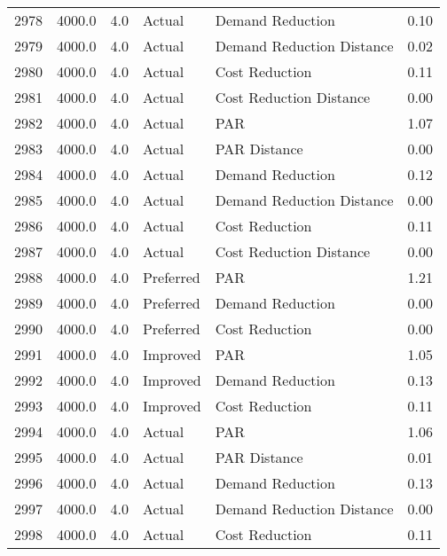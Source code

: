 \begin{longtable}{lrrllr}
2978 &       4000.0 &     4.0 &         Actual &           Demand Reduction &   0.10 \\
2979 &       4000.0 &     4.0 &         Actual &  Demand Reduction Distance &   0.02 \\
2980 &       4000.0 &     4.0 &         Actual &             Cost Reduction &   0.11 \\
2981 &       4000.0 &     4.0 &         Actual &    Cost Reduction Distance &   0.00 \\
2982 &       4000.0 &     4.0 &         Actual &                        PAR &   1.07 \\
2983 &       4000.0 &     4.0 &         Actual &               PAR Distance &   0.00 \\
2984 &       4000.0 &     4.0 &         Actual &           Demand Reduction &   0.12 \\
2985 &       4000.0 &     4.0 &         Actual &  Demand Reduction Distance &   0.00 \\
2986 &       4000.0 &     4.0 &         Actual &             Cost Reduction &   0.11 \\
2987 &       4000.0 &     4.0 &         Actual &    Cost Reduction Distance &   0.00 \\
2988 &       4000.0 &     4.0 &      Preferred &                        PAR &   1.21 \\
2989 &       4000.0 &     4.0 &      Preferred &           Demand Reduction &   0.00 \\
2990 &       4000.0 &     4.0 &      Preferred &             Cost Reduction &   0.00 \\
2991 &       4000.0 &     4.0 &       Improved &                        PAR &   1.05 \\
2992 &       4000.0 &     4.0 &       Improved &           Demand Reduction &   0.13 \\
2993 &       4000.0 &     4.0 &       Improved &             Cost Reduction &   0.11 \\
2994 &       4000.0 &     4.0 &         Actual &                        PAR &   1.06 \\
2995 &       4000.0 &     4.0 &         Actual &               PAR Distance &   0.01 \\
2996 &       4000.0 &     4.0 &         Actual &           Demand Reduction &   0.13 \\
2997 &       4000.0 &     4.0 &         Actual &  Demand Reduction Distance &   0.00 \\
2998 &       4000.0 &     4.0 &         Actual &             Cost Reduction &   0.11 \\

\end{longtable}
